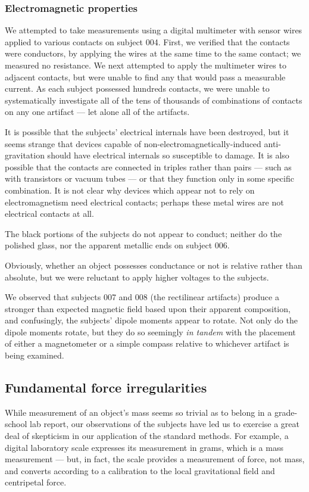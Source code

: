 \documentclass[10pt,twoside,openany]{article}
\theoremstyle{definition}
\begin{document}
\subsubsection{Electromagnetic properties}
We attempted to take measurements using a digital multimeter with sensor wires applied to various contacts on subject 004.
First, we verified that the contacts were conductors, by applying the wires at the same time to the same contact; we measured no resistance.
We next attempted to apply the multimeter wires to adjacent contacts, but were unable to find any that would pass a measurable current.
As each subject possessed hundreds contacts, we were unable to systematically investigate all of the tens of thousands of combinations of contacts on any one artifact --- let alone all of the artifacts.

It is possible that the subjects' electrical internals have been destroyed, but it seems strange that devices capable of non-electromagnetically-induced anti-gravitation should have electrical internals so susceptible to damage.
It is also possible that the contacts are connected in triples rather than pairs --- such as with transistors or vacuum tubes --- or that they function only in some specific combination.
It is not clear why devices which appear not to rely on electromagnetism need electrical contacts; perhaps these metal wires are not electrical contacts at all.

The black portions of the subjects do not appear to conduct; neither do the polished glass, nor the apparent metallic ends on subject 006.

Obviously, whether an object possesses conductance or not is relative rather than absolute, but we were reluctant to apply higher voltages to the subjects.

We observed that subjects 007 and 008 (the rectilinear artifacts) produce a stronger than expected magnetic field based upon their apparent composition, and confusingly, the subjects' dipole moments appear to rotate.
Not only do the dipole moments rotate, but they do so seemingly \textit{in tandem} with the placement of either a magnetometer or a simple compass relative to whichever artifact is being examined.

\subsection{Fundamental force irregularities}
While measurement of an object's mass seems so trivial as to belong in a grade-school lab report, our observations of the subjects have led us to exercise a great deal of skepticism in our application of the standard methods.
For example, a digital laboratory scale expresses its measurement in grams, which is a mass measurement --- but, in fact, the scale provides a measurement of force, not mass, and converts according to a calibration to the local gravitational field and centripetal force.
\end{document}
